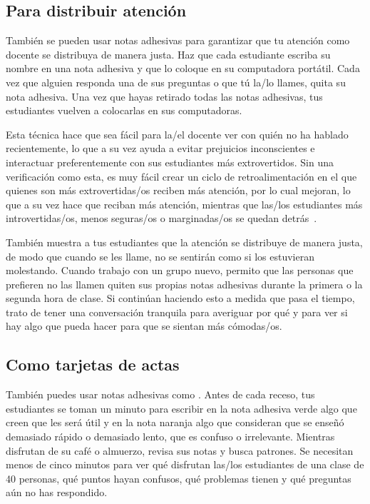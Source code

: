 \subsection*{Para distribuir atención}

También se pueden usar notas adhesivas para garantizar que tu atención como docente se distribuya de manera justa.
Haz que cada estudiante escriba su nombre en una nota adhesiva
y que lo coloque en su computadora portátil.
Cada vez que alguien responda una de sus preguntas o que tú la/lo llames,
quita su nota adhesiva.
Una vez que hayas retirado todas las notas adhesivas,
tus estudiantes vuelven a colocarlas en sus computadoras.

Esta técnica hace que sea fácil para la/el docente ver con quién no ha hablado recientemente,
lo que a su vez ayuda a evitar prejuicios inconscientes
e interactuar preferentemente con sus estudiantes más extrovertidos.
Sin una verificación como esta,
es muy fácil crear un ciclo de retroalimentación en el que quienes son más extrovertidas/os reciben más atención,
por lo cual mejoran,
lo que a su vez hace que reciban más atención,
mientras que las/los estudiantes más introvertidas/os, menos seguras/os o marginadas/os se quedan detrás~\cite{Alvi1999,Juss2005}.

También muestra a tus estudiantes que la atención se distribuye de manera justa,
de modo que cuando se les llame,
no se sentirán como si los estuvieran molestando.
Cuando trabajo con un grupo nuevo,
permito que las personas que prefieren no las llamen quiten sus propias notas adhesivas
durante la primera o la segunda hora de clase.
Si continúan haciendo esto a medida que pasa el tiempo,
trato de tener una conversación tranquila para averiguar por qué
y para ver si hay algo que pueda hacer para que se sientan más cómodas/os.

\subsection*{Como tarjetas de actas}

También puedes usar notas adhesivas como .
Antes de cada receso,
tus estudiantes se toman un minuto para escribir en la nota adhesiva verde
algo que creen que les será útil
y en la nota naranja
algo que consideran que se enseñó demasiado rápido o demasiado lento,
que es confuso
o irrelevante.
Mientras disfrutan de su café o almuerzo,
revisa sus notas y busca patrones.
Se necesitan menos de cinco minutos para ver qué disfrutan las/los estudiantes de una clase de 40 personas,
qué puntos hayan confusos,
qué problemas tienen
y qué preguntas aún no has respondido.

